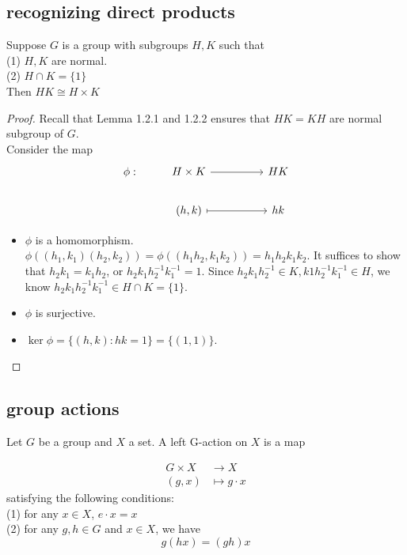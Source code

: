 \documentclass[11pt,fleqn]{book} %
\begin{document}
\begin{CJK}{UTF8}{gkai}
\subsection{recognizing direct products}
\begin{theorem}
	 Suppose $G$ is a group with subgroups $H, K$ such that \\
	(1) $H, K$ are normal. \\
	(2) $H \cap K = \{1\}$ \\
	Then $HK \cong H \times K$
\end{theorem}
\begin{proof}
	Recall that Lemma 1.2.1 and 1.2.2 ensures that $HK = KH$ are normal subgroup of $G$. \\
	Consider the map 
	\[\begin{tikzcd}
		{\phi:} & {H\times K} && HK \\
		& {(h,k)} && hk
		\arrow[from=1-2, to=1-4]
		\arrow[maps to, from=2-2, to=2-4]
	\end{tikzcd}\]
	\begin{itemize}
		\item $\phi$ is a homomorphism. $\phi((h_1,k_1)(h_2,k_2)) = \phi((h_1h_2,k_1k_2))=h_1h_2k_1k_2$. It suffices to show that $h_2k_1 = k_1h_2$, or $h_2k_1h_2^{-1}k_1^{-1} = 1$. Since $h_2k_1h_2^{-1} \in K, k1h_2^{-1}k_1^{-1}\in H$, we know $h_2k_1h_2^{-1}k_1^{-1}\in H \cap K = \{1\}$.
		\item $\phi$ is surjective.
		\item $\ker \phi = \{(h,k) : hk = 1\} = \{(1,1)\}$.
	\end{itemize}
\end{proof}

\subsection{group actions}
\begin{definition}
	Let $G$ be a group and $X$ a set. A left G-action on $X$ is a map 
	
		\begin{align*}
			G \times X & \to X \\
			  (g,x) & \mapsto g  \cdot x 
	   \end{align*}
	satisfying the following conditions: \\
	(1) for any $x \in X$, $e \cdot x = x$ \\
	(2) for any $g,h \in G$ and $x \in X$, we have 
	\[g(hx) = (gh)x\]
\end{definition}


\end{CJK}
\end{document}
